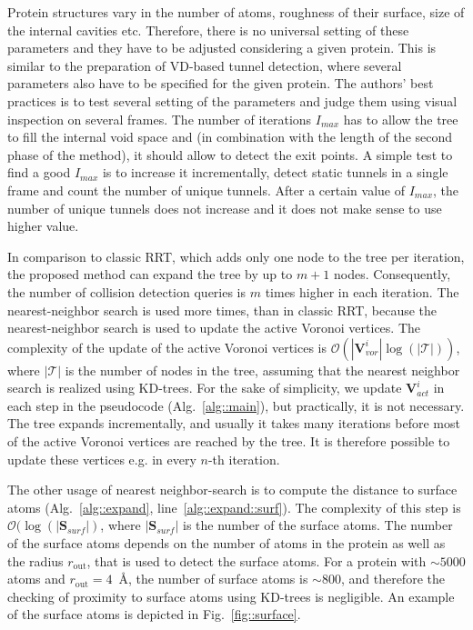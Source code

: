 \documentclass[usletter, 10pt, conference]{svjour3}      %
\def\T{\mathcal{T}}
\def\Imax{I_{max}} %
\def\VV{\mathbf{V}_{vor}}
\def\VVA{\mathbf{V}_{act}}
\def\gprobe{r_{\mathrm{out}}}
\def\SSA{\mathbf{S}_{surf}}
\begin{document}
Protein structures vary in the number of atoms, roughness of their surface, size of the internal cavities etc. 
Therefore, there is no universal setting of these parameters and they have to be adjusted considering a given protein.
This is similar to the preparation of VD-based tunnel detection, where several parameters  also have to be specified for the
given protein.
The authors' best practices is to test several setting of the parameters and judge them using visual inspection on several frames.
The number of iterations $\Imax$ has to allow the tree to fill the internal void space and (in combination with the length of the second phase of the method), it should allow to detect the exit points.
A simple test to find a good $\Imax$ is to increase it incrementally, detect static tunnels in a single frame and count the number
of unique tunnels.
After a certain value of $\Imax$, the number of unique tunnels does not increase and it does not make sense to use higher value.


In comparison to classic RRT, which adds only one node to the tree per iteration, the proposed method can expand the tree by up to $m+1$ nodes.
Consequently, the number of collision detection queries is $m$ times higher in each iteration.
The nearest-neighbor search is used more times, than in classic RRT, because  the nearest-neighbor search is used to update the active Voronoi vertices.
The complexity of the update of the active Voronoi vertices is $\mathcal{O}(|\VV^i|\log(|\T|))$, where $|\T|$ is the number of nodes in the tree, assuming that the nearest neighbor search is realized using KD-trees.
For the sake of simplicity, we update $\VVA^i$ in each step in the pseudocode (Alg.~\ref{alg::main}), but practically, it is not necessary.
The tree expands incrementally, and usually it takes many iterations before most of the active Voronoi vertices are
reached by the tree.
It is therefore possible to update these vertices e.g. in every $n$-th iteration. 

The other usage of nearest neighbor-search is to compute the distance to surface atoms (Alg.~\ref{alg::expand}, line~\ref{alg::expand::surf}).
The complexity of this step is $\mathcal{O}(\log( |\SSA|)$, where $|\SSA|$ is the number of the surface atoms.
The number of the surface atoms depends on the number of atoms in the protein as well as the radius $\gprobe$, that is used to
detect the surface atoms.
For a protein with $\sim 5000$ atoms and $\gprobe=4$~\AA, the number of surface atoms is $\sim800$, and therefore the checking
of proximity to surface atoms using KD-trees is negligible. 
An example of the surface atoms is depicted in Fig.~\ref{fig::surface}.
\end{document}
